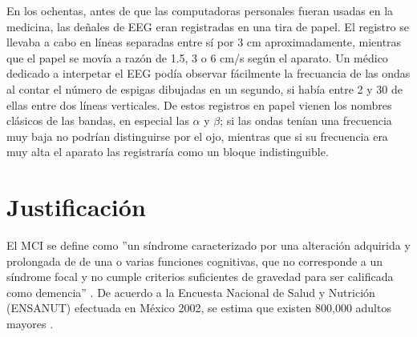 %



En los ochentas, antes de que las computadoras personales fueran usadas en la medicina, las
de\~nales de EEG eran registradas en una tira de papel. El registro se llevaba a cabo
en l\'ineas separadas entre s\'i por 3 cm aproximadamente, mientras que el papel se mov\'ia a 
raz\'on de 1.5, 3 o 6 cm/s seg\'un el aparato. Un m\'edico dedicado a interpetar el EEG pod\'ia
observar f\'acilmente la frecuancia de las ondas al contar el n\'umero de espigas dibujadas
en un segundo, si hab\'ia entre 2 y 30 de ellas entre dos l\'ineas verticales. De estos registros
en papel vienen los nombres cl\'asicos de las bandas, en especial las $\alpha$ y $\beta$; si las
ondas ten\'ian una frecuencia muy baja no podr\'ian distinguirse por el ojo, 
mientras que si su frecuencia era muy alta el aparato las registrar\'ia como un bloque 
indistinguible\cite{Klonowski09}.



\section{Justificaci\'on}

El MCI se define como ''un s\'indrome caracterizado por una alteraci\'on adquirida y prolongada de
de una o varias funciones cognitivas, que no corresponde a un s\'indrome focal y no cumple
criterios suficientes de gravedad para ser calificada como demencia'' \cite{Robles02}.
De acuerdo a la Encuesta Nacional de Salud y Nutrici\'on (ENSANUT) efectuada en M\'exico 2002,
se estima que existen 800,000 adultos mayores \cite{Sosa12}.


